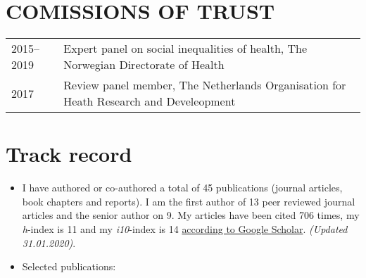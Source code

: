 \documentclass[11pt,a4paper,a4paper]{article}
\providecommand{\tightlist}{%
  \setlength{\itemsep}{0pt}\setlength{\parskip}{0pt}}
\newcounter{papers}
\begin{document}
\hypertarget{comissions-of-trust}{%
\section{COMISSIONS OF TRUST}\label{comissions-of-trust}}

\begin{tabular}{ll}
  2015--2019 & Expert panel on social inequalities of health, The Norwegian Directorate of Health \\ 
  2017 & Review panel member, The Netherlands Organisation for Heath Research and Develeopment \\ 
  \end{tabular}

\hypertarget{track-record}{%
\section{Track record}\label{track-record}}

\begin{itemize}
\tightlist
\item
  I have authored or co-authored a total of 45 publications (journal articles, book chapters and reports). I am the first author of 13 peer reviewed journal articles and the senior author on 9. My articles have been cited 706 times, my \emph{h}-index is 11 and my \emph{i10}-index is 14 \href{https://scholar.google.com/citations?user=TMC38ZgAAAAJ\&hl=en}{according to Google Scholar}. \emph{(Updated 31.01.2020)}.
\item
  Selected publications:
  \newrefcontext[sorting=none]\setcounter{papers}{0}\pagebreak[3]\printbibliography[category=bib-/Users/st06810/Dropbox/AkademiskCV/tpubs_zot.bib-5206435,heading=none]\setcounter{papers}{0}
\end{itemize}

\nocite{BoeSocioeconomicstatuschildren2012,
BoeSocioeconomicstatuschild2014,
BoeInterplaySubjectiveObjective2019a,
BoeCumulativeeffectsnegative2017,
BoeEconomicvolatilitychildhood2017,
Arntzen29recommendationscombat2019,
BoeFinancialdifficultieschildhood2017,
Boestrengthsdifficultiesquestionnaire2016,
SmidMeasurementEquivalenceConvergent2018,
BoeSosiookonomiskstatusog2015}
\end{document}
